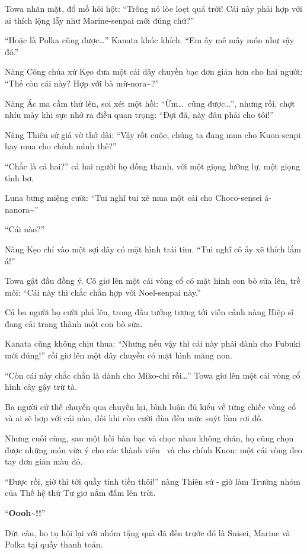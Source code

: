 \documentclass[../main.tex]{subfiles}
\begin{document}
Towa nhăn mặt, đổ mồ hôi hột: ``Trông nó lòe loẹt quá trời! Cái này phải hợp với ai thích lộng lẫy như Marine-senpai mới đúng chứ?''

``Hoặc là Polka cũng được\dots'' Kanata khúc khích. ``Em ấy mê mấy món như vậy đó.''

Nàng Công chúa xứ Kẹo đưa một cái dây chuyền bạc đơn giản hơn cho hai người: ``Thế còn cái này? Hợp với bà mừ-nora\~{}?''

Nàng Ác ma cầm thử lên, soi xét một hồi: ``Ừm\dots\ cũng được\dots'', nhưng rồi, chợt nhíu mày khi sực nhớ ra điều quan trọng: ``Đợi đã, này đâu phải cho tôi!''

Nàng Thiên sứ giả vờ thở dài: ``Vậy rốt cuộc, chúng ta đang mua cho Kuon-senpi hay mua cho chính mình thế?''

``Chắc là cả hai?'' cả hai người họ đồng thanh, với một giọng lưỡng lự, một giọng tỉnh bơ.

Luna bưng miệng cười: ``Tui nghĩ tui xẽ mua một cái cho Choco-sensei á-nanora\~{}''

``Cái nào?''

Nàng Kẹo chỉ vào một sợi dây có mặt hình trái tim. ``Tui nghĩ cô ấy xẽ thích lắm á!''

Towa gật đầu đồng ý. Cô giơ lên một cái vòng cổ có mặt hình con bò sữa lên, trề môi: ``Cái này thì chắc chắn hợp với Noel-senpai này.''

Cả ba người họ cười phá lên, trong đầu tưởng tượng tới viễn cảnh nàng Hiệp sĩ đang cải trang thành một con bò sữa.

Kanata cũng không chịu thua: ``Nhưng nếu vậy thì cái này phải dành cho Fubuki mới đúng!'' rồi giơ lên một dây chuyền có mặt hình măng non.

``Còn cái này chắc chắn là dành cho Miko-chi rồi\dots'' Towa giơ lên một cái vòng cổ hình cây gậy trừ tà.

Ba người cứ thế chuyền qua chuyền lại, bình luận đủ kiểu về từng chiếc vòng cổ và ai sẽ hợp với cái nào, đôi khi còn cười đùa đến mức suýt làm rơi đồ.

Nhưng cuối cùng, sau một hồi bàn bạc và chọc nhau không chán, họ cũng chọn được những món vừa ý cho các thành viên \hll\ và cho chính Kuon: một cái vòng đeo tay đơn giản màu đỏ.

``Được rồi, giờ thì tới quầy tính tiền thôi!'' nàng Thiên sứ - giờ làm Trưởng nhóm của Thế hệ thứ Tư giơ nắm đấm lên trời.

``\textbf{Oooh\~{}!!}''

Dứt câu, họ tụ hội lại với nhóm tặng quà đã đến trước đó là Suisei, Marine và Polka tại quầy thanh toán.
\end{document}
